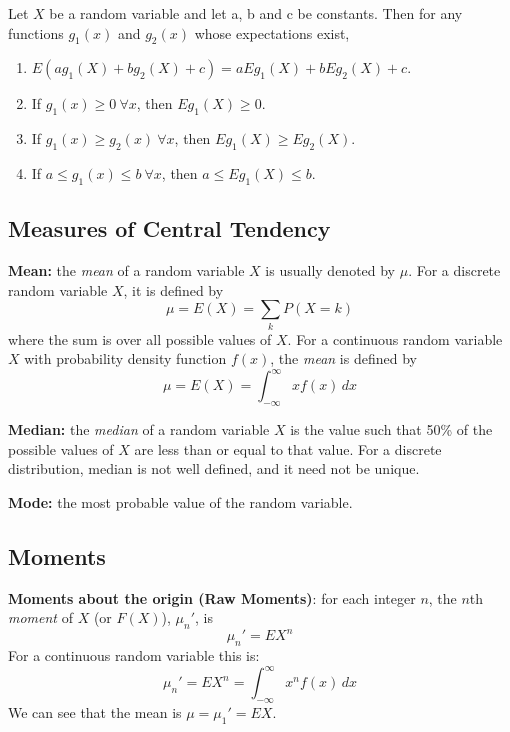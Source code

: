 \begin{theorem}
	Let $X$ be a random variable and let a, b and c be constants. Then for any functions $g_1(x)$ and $g_2(x)$ whose expectations exist,
	\begin{enumerate}[\bfseries a)]
		\item $E(ag_1(X) + bg_2(X) + c) = aEg_1(X) + bEg_2(X) + c$.
		\item If $g_1(x) \geq 0 \ \forall x$, then $Eg_1(X) \geq 0$.
		\item If $g_1(x) \geq g_2(x) \ \forall x$, then $Eg_1(X) \geq Eg_2(X)$.
		\item If $a \leq g_1(x) \leq b \ \forall x$, then $a \leq Eg_1(X) \leq b$. 
	\end{enumerate}
\end{theorem}

\subsection{Measures of Central Tendency}

\begin{definition}
	\textbf{Mean:} the \textit{mean} of a random variable $X$ is usually denoted by $\mu$. For a discrete random variable $X$, it is defined by
	\[
		\mu = E(X) = \sum_{k}P(X = k)
	\]
	where the sum is over all possible values of $X$. For a continuous random variable $X$ with probability density function $f(x)$, the \textit{mean} is defined by
	\[
		\mu = E(X) = \int_{-\infty}^{\infty} xf(x) \, dx
	\]
\end{definition}

\begin{definition}
	\textbf{Median:} the \textit{median} of a random variable $X$ is the value such that 50\% of the possible values of $X$ are less than or equal to that value. For a discrete distribution, median is not well defined, and it need not be unique.
\end{definition}

\begin{definition}
	\textbf{Mode:} the most probable value of the random variable.
\end{definition}

\subsection{Moments}

\begin{definition}
	\textbf{Moments about the origin (Raw Moments)}: for each integer $n$, the $n$th \textit{moment} of $X$ (or $F(X)$), $\mu_n'$, is
	\[
		\mu_n' = EX^n
	\]
	For a continuous random variable this is:
	\[
		\mu_n' = EX^n = \int_{-\infty}^{\infty} x^n f(x) \, dx
	\]
	We can see that the mean is $\mu = \mu_1' = EX$.
\end{definition}

